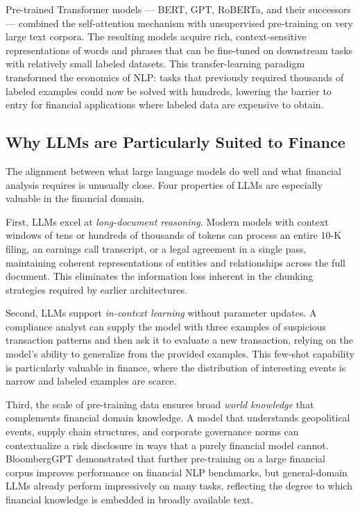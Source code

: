 Pre-trained Transformer models --- BERT, GPT, RoBERTa, and their
successors --- combined the self-attention mechanism with unsupervised
pre-training on very large text corpora.  The resulting models acquire
rich, context-sensitive representations of words and phrases that can
be fine-tuned on downstream tasks with relatively small labeled datasets.
This transfer-learning paradigm transformed the economics of NLP: tasks
that previously required thousands of labeled examples could now be
solved with hundreds, lowering the barrier to entry for financial
applications where labeled data are expensive to obtain.

\subsection{Why LLMs are Particularly Suited to Finance}
\label{subsec:llms-suited-finance}

The alignment between what large language models do well and what
financial analysis requires is unusually close.  Four properties of
LLMs are especially valuable in the financial domain.

First, LLMs excel at \emph{long-document reasoning}.  Modern models with
context windows of tens or hundreds of thousands of tokens can process
an entire 10-K filing, an earnings call transcript, or a legal agreement
in a single pass, maintaining coherent representations of entities and
relationships across the full document.  This eliminates the
information loss inherent in the chunking strategies required by
earlier architectures.

Second, LLMs support \emph{in-context learning} without parameter
updates.  A compliance analyst can supply the model with three examples
of suspicious transaction patterns and then ask it to evaluate a new
transaction, relying on the model's ability to generalize from the
provided examples.  This few-shot capability is particularly valuable
in finance, where the distribution of interesting events is narrow and
labeled examples are scarce.

Third, the scale of pre-training data ensures broad \emph{world knowledge}
that complements financial domain knowledge.  A model that understands
geopolitical events, supply chain structures, and corporate governance
norms can contextualize a risk disclosure in ways that a purely financial
model cannot.  BloombergGPT \parencite{wu2023bloomberggpt} demonstrated
that further pre-training on a large financial corpus improves performance
on financial NLP benchmarks, but general-domain LLMs already perform
impressively on many tasks, reflecting the degree to which financial
knowledge is embedded in broadly available text.

